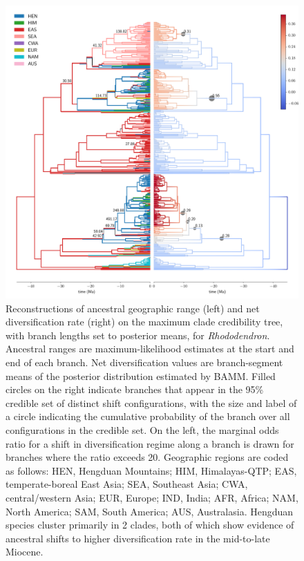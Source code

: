 \documentclass[9pt,twocolumn,twoside,lineno]{pnas-new}
\begin{document}
\begin{figure}
\centering
\includegraphics[width=.99\linewidth]{Rhododendron.pdf}
\caption{Reconstructions of ancestral geographic range (left) and net
  diversification rate (right) on the maximum clade credibility tree,
  with branch lengths set to posterior means, for
  \textit{Rhododendron}. Ancestral ranges are maximum-likelihood
  estimates at the start and end of each branch. Net diversification
  values are branch-segment means of the posterior distribution
  estimated by BAMM. Filled circles on the right indicate branches
  that appear in the 95\% credible set of distinct shift
  configurations, with the size and label of a circle indicating the
  cumulative probability of the branch over all configurations in the
  credible set. On the left, the marginal odds ratio for a shift in
  diversification regime along a branch is drawn for branches where
  the ratio exceeds 20. Geographic regions are coded as follows: HEN,
  Hengduan Mountains; HIM, Himalayas-QTP; EAS, temperate-boreal East
  Asia; SEA, Southeast Asia; CWA, central/western Asia; EUR, Europe;
  IND, India; AFR, Africa; NAM, North America; SAM, South America;
  AUS, Australasia. Hengduan species cluster primarily in 2 clades,
  both of which show evidence of ancestral shifts to higher
  diversification rate in the mid-to-late Miocene.}
\label{fig:rhododendron}
\end{figure}
\end{document}
